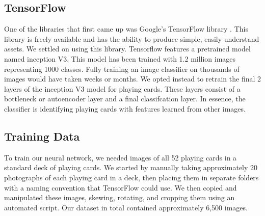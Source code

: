 \documentclass[letterpaper]{article}
\begin{document}
\subsection{TensorFlow}
One of the libraries that first came up was Google's TensorFlow library \cite{tensorflow}.  This library is freely available and has the ability to produce simple, easily understand assets.  We settled on using this library.
Tensorflow features a pretrained model named inception V3.  This model has been trained with 1.2 million images representing 1000 classes.  Fully training an image classifier on thousands of images would have taken weeks or months.  We opted instead to retrain the final 2 layers of the inception V3 model for playing cards.  These layers consist of a bottleneck or autoencoder layer and a final classifcation layer.  In essence, the classifier is identifying playing cards with features learned from other images. 

\subsection{Training Data}
To train our neural network, we needed images of all 52 playing cards in a standard deck of playing cards.  We started by manually taking approximately 20 photographs of each playing card in a deck, then placing them in separate folders with a naming convention that TensorFlow could use.  We then copied and manipulated these images, skewing, rotating, and cropping them using an automated script. Our dataset in total contained approximately 6,500 images.
\end{document}
